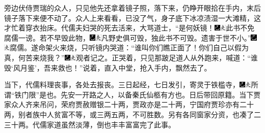 旁边伏侍贾瑞的众人，只见他先还拿着镜子照，落下来，仍睁开眼拾在手内，末后镜子落下来便不动了。众人上来看看，已没了气，身子底下冰凉渍湿一大滩精，这才忙着穿衣抬床。代儒夫妇哭的死去活来，大骂道士，“是何妖镜！{\includegraphics[width=3mm]{../Images/00003}\includegraphics[width=3mm]{../Images/00012}\footnotesize \kaishu 此书不免腐儒一谤。}若不早毁此物，{\includegraphics[width=3mm]{../Images/00003}\includegraphics[width=3mm]{../Images/00012}\footnotesize \kaishu 凡野史俱可毁，独此书不可毁。}遗害于世不小。”{\includegraphics[width=3mm]{../Images/00003}\includegraphics[width=3mm]{../Images/00012}\footnotesize \kaishu 腐儒。}遂命架火来烧，只听镜内哭道：“谁叫你们瞧正面了！你们自己以假为真，何苦来烧我？”{\includegraphics[width=3mm]{../Images/00003}\includegraphics[width=3mm]{../Images/00012}\footnotesize \kaishu 观者记之。}正哭着，只见那跛足道人从外跑来，喊道：“谁毁‘风月鉴’，吾来救也！”说着，直入中堂，抢入手内，飘然去了。

当下，代儒料理丧事，各处去报丧。三日起经，七日发引，寄灵于铁槛寺，{\includegraphics[width=3mm]{../Images/00003}\includegraphics[width=3mm]{../Images/00012}\footnotesize \kaishu 所谓“铁门限”是也。先安一开路之人，以备秦氏仙柩有方也。}日后带回原籍。当下贾家众人齐来吊问，荣府贾赦赠银二十两，贾政亦是二十两，宁国府贾珍亦有二十两，别者族中人贫富不等，或三两五两，不可胜数。另有各同窗家分资，也凑了二三十两。代儒家道虽然淡薄，倒也丰丰富富完了此事。


